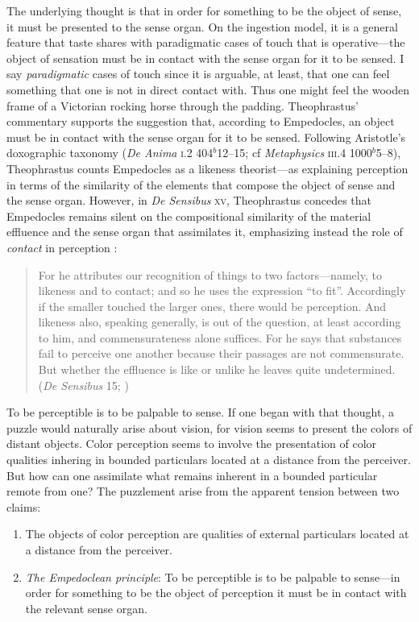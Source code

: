 
The underlying thought is that in order for something to be the object of sense, it must be presented to the sense organ. On the ingestion model, it is a general feature that taste shares with paradigmatic cases of touch that is operative---the object of sensation must be in contact with the sense organ for it to be sensed. I say \emph{paradigmatic} cases of touch since it is arguable, at least, that one can feel something that one is not in direct contact with. Thus one might feel the wooden frame of a Victorian rocking horse through the padding. Theophrastus' commentary supports the suggestion that, according to Empedocles, an object must be in contact with the sense organ for it to be sensed. Following Aristotle's doxographic taxonomy (\emph{De Anima} \textsc{i}.2 404\( ^{b} \)12--15; cf \emph{Metaphysics} \textsc{iii}.4 1000\( ^{b} \)5--8), Theophrastus counts Empedocles as a likeness theorist---as explaining perception in terms of the similarity of the elements that compose the object of sense and the sense organ. However, in \emph{De Sensibus} \textsc{xv}, Theophrastus concedes that Empedocles remains silent on the compositional similarity of the material effluence and the sense organ that assimilates it, emphasizing instead the role of \emph{contact} in perception \citep{Kamtekar:2009fk,Sedley:1992uq}:
\begin{quote}
	For he attributes our recognition of things to two factors---namely, to likeness and to contact; and so he uses the expression ``to fit''. Accordingly if the smaller touched the larger ones, there would be perception. And likeness also, speaking generally, is out of the question, at least according to him, and commensurateness alone suffices. For he says that substances fail to perceive one another because their passages are not commensurate. But whether the effluence is like or unlike he leaves quite undetermined. (\emph{De Sensibus} 15; \citealt{Stratton:1917vn})
\end{quote}

To be perceptible is to be palpable to sense. If one began with that thought, a puzzle would naturally arise about vision, for vision seems to present the colors of distant objects. Color perception seems to involve the presentation of color qualities inhering in bounded particulars located at a distance from the perceiver. But how can one assimilate what remains inherent in a bounded particular remote from one? The puzzlement arise from the apparent tension between two claims:
\begin{enumerate}[(1)]
    \item The objects of color perception are qualities of external particulars located at a distance from the perceiver.
    \item \emph{The Empedoclean principle}: To be perceptible is to be palpable to sense---in order for something to be the object of perception it must be in contact with the relevant sense organ.
\end{enumerate}

